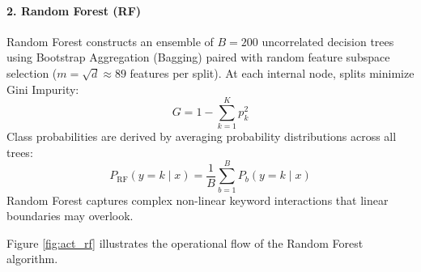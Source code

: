 \paragraph{2. Random Forest (RF)}
Random Forest constructs an ensemble of $B = 200$ uncorrelated decision trees using Bootstrap Aggregation (Bagging) paired with random feature subspace selection ($m = \sqrt{d} \approx 89$ features per split). At each internal node, splits minimize Gini Impurity:
\begin{equation}
G = 1 - \sum_{k=1}^{K} p_k^2
\end{equation}
Class probabilities are derived by averaging probability distributions across all trees:
\begin{equation}
P_{\text{RF}}(y = k \mid x) = \frac{1}{B} \sum_{b=1}^{B} P_b(y = k \mid x)
\end{equation}
Random Forest captures complex non-linear keyword interactions that linear boundaries may overlook.

Figure \ref{fig:act_rf} illustrates the operational flow of the Random Forest algorithm.


